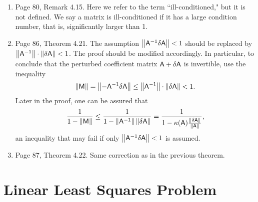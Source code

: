 \documentclass{book}
\begin{document}
	\begin{enumerate}
	\item
Page 80, Remark 4.15. Here we refer to the term ``ill-conditioned," but it is not defined. We say a matrix is  ill-conditioned if it has a large condition number, that is, significantly larger than 1.

	\item
Page 86, Theorem 4.21. The assumption $\left\| \mathsf{A}^{-1}\delta\mathsf{A} \right\| < 1$ should be replaced by $\left\| \mathsf{A}^{-1} \right\| \cdot \left\| \delta\mathsf{A} \right\| < 1$. The proof should be modified accordingly. In particular, to conclude that the perturbed coefficient matrix $\mathsf{A}+\delta\mathsf{A}$ is invertible, use the inequality
	\[
\left\| \mathsf{M} \right\| = \left\|  - \mathsf{A}^{-1}\delta\mathsf{A} \right\| \le \left\| \mathsf{A}^{-1} \right\| \cdot \left\| \delta\mathsf{A} \right\| < 1.
	\]
Later in the proof, one can be assured that
	\[
\frac{1}{1-\left\| \mathsf{M} \right\|} \le \frac{1}{1-\left\| \mathsf{A}^{-1} \right\|\left\| \delta\mathsf{A} \right\|} = \frac{1}{1-\kappa(\mathsf{A}) \frac{\left\| \delta\mathsf{A} \right\|}{\left\| \mathsf{A} \right\|}},
	\]
an inequality that may fail if only $\left\| \mathsf{A}^{-1}\delta\mathsf{A} \right\| < 1$ is assumed.

	\item
Page 87, Theorem 4.22. Same correction as in the previous theorem.

	\end{enumerate}
	
	\chapter{Linear Least Squares Problem}
	
\end{document}
